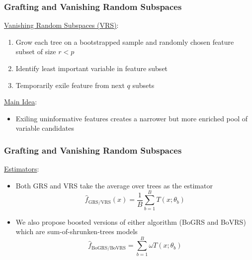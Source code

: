 \documentclass{beamer}
\begin{document}
\begin{frame}

    \frametitle{Grafting and Vanishing Random Subspaces}
    
    \underline{Vanishing Random Subspaces (VRS)}:
    \medskip
    \begin{enumerate}
        \item Grow each tree on a bootstrapped sample and randomly chosen feature 
              subset of size $r<p$
        \item Identify least important variable in feature subset
        \item Temporarily exile feature from next $q$ subsets
    \end{enumerate}
    
    \bigskip
    
    \underline{Main Idea}:
    \begin{itemize}
        \item Exiling uninformative features creates a narrower but more enriched 
              pool of variable candidates
    \end{itemize}

\end{frame}



\begin{frame}

    \frametitle{Grafting and Vanishing Random Subspaces}
    
    \underline{Estimators}:
    \medskip
    \begin{itemize}
        \item Both GRS and VRS take the average over trees as the estimator
        \begin{equation}
            \hat{f}_\text{GRS/VRS}(x) = \frac{1}{B}\sum_{b=1}^B T(x; \theta_b)
        \end{equation}
        \item We also propose boosted versions of either algorithm (BoGRS and
              BoVRS) which are sum-of-shrunken-trees models
        \begin{equation}
            \hat{f}_\text{BoGRS/BoVRS} = \sum_{b=1}^B \omega T(x; \theta_b)
        \end{equation}
    \end{itemize}

\end{frame}
\end{document}
